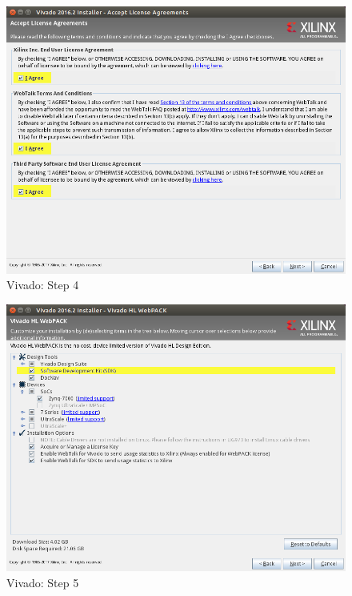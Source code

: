 \begin{figure}
    \centering
    \includegraphics[width=1\textwidth,trim={0 5cm 0 0cm},clip]{images/devguide/vivado-install-02.png}
    \caption[Vivado: Step 4]{%
        Vivado: Step 4
    }
    \label{fig:devguide:vivado4}
\end{figure}

\begin{figure}
    \centering
    \includegraphics[width=1\textwidth,trim={0 6cm 0 0cm},clip]{images/devguide/vivado-install-04.png}
    \caption[Vivado: Step 5]{%
        Vivado: Step 5
    }
    \label{fig:devguide:vivado5}
\end{figure}

